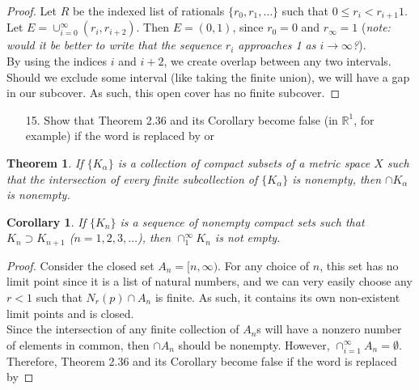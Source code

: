 \documentclass[10pt]{article}
\theoremstyle{definition}
\theoremstyle{plain}
\newtheorem*{theorem*}{Theorem}
\newtheorem*{corollary*}{Corollary}
\newcommand{\R}{\mathbb{R}}
\begin{document}
\begin{proof}
Let $R$ be the indexed list of rationals $\{r_0, r_1, \dots\}$ such that $0\leq r_i < r_{i+1}  1$. \\

Let $E=\cup_{i=0}^\infty (r_i, r_{i+2}).$ Then $E=(0,1)$, since $r_0=0$ and $r_\infty = 1$ (\textit{note: would it be better to write that the sequence $r_i$ approaches 1 as $i\rightarrow\infty$?}). \\

By using the indices $i$ and $i+2$, we create overlap between any two intervals. Should we exclude some interval (like taking the finite union), we will have a gap in our subcover. As such, this open cover has no finite subcover.
\end{proof}




\pagebreak





\begin{enumerate}
\item[15.] Show that Theorem 2.36 and its Corollary become false (in $\R^1$, for example) if the word  is replaced by  or 
\end{enumerate}
\setcounter{equation}{2}
\begin{theorem*}
If $\{K_\alpha\}$ is a collection of compact subsets of a metric space $X$ such that the intersection of every finite subcollection of $\{K_\alpha\}$ is nonempty, then $\cap K_\alpha$ is nonempty.
\end{theorem*}

\begin{corollary*}
If $\{K_n\}$ is a sequence of nonempty compact sets such that $K_n \supset K_{n+1}$ ($n=1,2,3,\dots$), then $\cap_1^\infty K_n$ is not empty.
\end{corollary*}

\begin{proof}
Consider the closed set $A_n=[n,\infty)$. For any choice of $n$, this set has no limit point since it is a list of natural numbers, and we can very easily choose any $r < 1$ such that $N_r(p)\cap A_n$ is finite. As such, it contains its own non-existent limit points and is closed. \\

Since the intersection of any finite collection of $A_n$s will have a nonzero number of elements in common, then $\cap A_n$ should be nonempty. However, $\cap_{i=1}^\infty A_n = \emptyset$. \\

Therefore, Theorem 2.36 and its Corollary become false if the word  is replaced by 
\end{proof}
\end{document}
